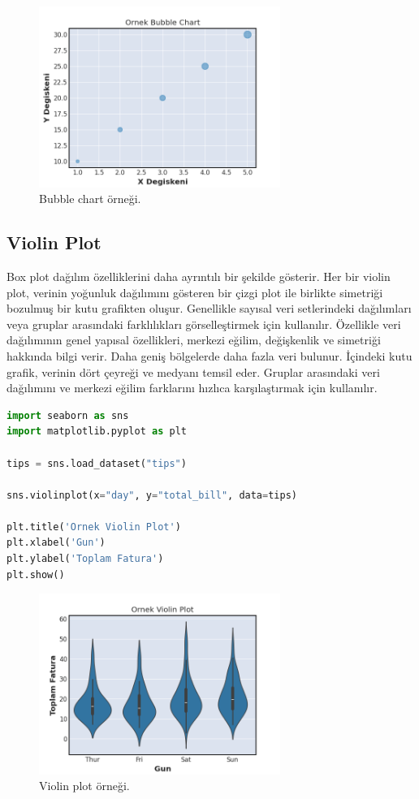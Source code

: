 \begin{figure}[h]
    \centering
    \includegraphics[width=0.7\textwidth]{images/bubble_chart.png}
    \caption{Bubble chart örneği.}
    \label{fig:enter-label}
\end{figure}

\newpage

\subsection{Violin Plot}
Box plot dağılım özelliklerini daha ayrıntılı bir şekilde gösterir. Her bir violin plot, verinin yoğunluk dağılımını gösteren bir çizgi plot ile birlikte simetriği bozulmuş bir kutu grafikten oluşur. Genellikle sayısal veri setlerindeki dağılımları veya gruplar arasındaki farklılıkları görselleştirmek için kullanılır. Özellikle veri dağılımının genel yapısal özellikleri, merkezi eğilim, değişkenlik ve simetriği hakkında bilgi verir. Daha geniş bölgelerde daha fazla veri bulunur. İçindeki kutu grafik, verinin dört çeyreği ve medyanı temsil eder. Gruplar arasındaki veri dağılımını ve merkezi eğilim farklarını hızlıca karşılaştırmak için kullanılır.

\begin{lstlisting}[language=Python]
import seaborn as sns
import matplotlib.pyplot as plt

tips = sns.load_dataset("tips")

sns.violinplot(x="day", y="total_bill", data=tips)

plt.title('Ornek Violin Plot')
plt.xlabel('Gun')
plt.ylabel('Toplam Fatura')
plt.show()
\end{lstlisting}

\begin{figure}[h]
    \centering
    \includegraphics[width=0.7\textwidth]{images/violin_plot.png}
    \caption{Violin plot örneği.}
    \label{fig:enter-label}
\end{figure}

